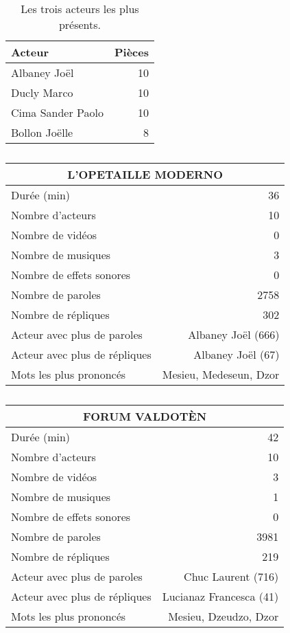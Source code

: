 \begin{table}[]
\centering
\caption{Les trois acteurs les plus présents.}
\begin{tabular}{lr}
    \toprule
\multicolumn{1}{l}{\textbf{Acteur}} & \textbf{Pièces} \\
    \midrule
\multicolumn{1}{l}{Albaney Joël} &10\\
\multicolumn{1}{l}{Ducly Marco} &10\\
\multicolumn{1}{l}{Cima Sander Paolo} &10\\
\multicolumn{1}{l}{Bollon Joëlle} &8\\
\bottomrule
\end{tabular}%
\end{table}
\newpage
    \begin{table}[]
    \centering
    \caption{}
    \begin{tabular}{lr}\toprule\multicolumn{2}{c}{L’OPETAILLE MODERNO} \\\midrule
\multicolumn{1}{l}{Durée (min)}&36\\
\multicolumn{1}{l}{Nombre d'acteurs}&10\\
\multicolumn{1}{l}{Nombre de vidéos}&0\\
\multicolumn{1}{l}{Nombre de musiques}&3\\
\multicolumn{1}{l}{Nombre de effets sonores}&0\\
\multicolumn{1}{l}{Nombre de paroles}&2758\\
\multicolumn{1}{l}{Nombre de répliques}&302\\
\multicolumn{1}{l}{Acteur avec plus de paroles}&Albaney Joël (666)\\
\multicolumn{1}{l}{Acteur avec plus de répliques}&Albaney Joël (67)\\
\multicolumn{1}{l}{Mots les plus prononcés}&Mesieu, Medeseun, Dzor\\
    \bottomrule
    \end{tabular}%
    \end{table}
    \begin{table}[]
    \centering
    \caption{}
    \begin{tabular}{lr}\toprule\multicolumn{2}{c}{FORUM VALDOTÈN} \\\midrule
\multicolumn{1}{l}{Durée (min)}&42\\
\multicolumn{1}{l}{Nombre d'acteurs}&10\\
\multicolumn{1}{l}{Nombre de vidéos}&3\\
\multicolumn{1}{l}{Nombre de musiques}&1\\
\multicolumn{1}{l}{Nombre de effets sonores}&0\\
\multicolumn{1}{l}{Nombre de paroles}&3981\\
\multicolumn{1}{l}{Nombre de répliques}&219\\
\multicolumn{1}{l}{Acteur avec plus de paroles}&Chuc Laurent (716)\\
\multicolumn{1}{l}{Acteur avec plus de répliques}&Lucianaz Francesca (41)\\
\multicolumn{1}{l}{Mots les plus prononcés}&Mesieu, Dzeudzo, Dzor\\
    \bottomrule
    \end{tabular}%
    \end{table}
